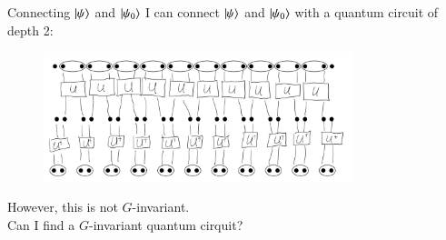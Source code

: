 \documentclass{beamer}
\begin{document}
\begin{frame}{Connecting $\ket{\psi}$ and $\ket{\psi_0}$}
	I can connect $\ket{\psi}$ and $\ket{\psi_0}$ with a quantum circuit of depth 2:
	\begin{figure}
		\center
		\includegraphics[width=0.8\textwidth]{Figures/ConnectingPsiAndPsi0.png}
	\end{figure}
	However, this is not $G$-invariant.\\
	\pause
	Can I find a $G$-invariant quantum cirquit?
\end{frame}
\end{document}
